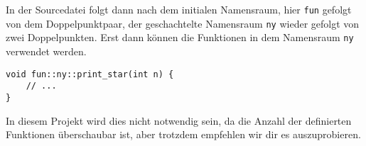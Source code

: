 In der Sourcedatei folgt dann nach dem initialen Namensraum, hier \lstinline{fun} gefolgt von dem Doppelpunktpaar, der geschachtelte Namensraum \lstinline{ny} wieder gefolgt von zwei Doppelpunkten.
Erst dann können die Funktionen in dem Namensraum \lstinline{ny} verwendet werden.

\begin{lstlisting}
void fun::ny::print_star(int n) {
	// ...
}
\end{lstlisting}

In diesem Projekt wird dies nicht notwendig sein, da die Anzahl der definierten Funktionen überschaubar ist, aber trotzdem empfehlen wir dir es auszuprobieren.

